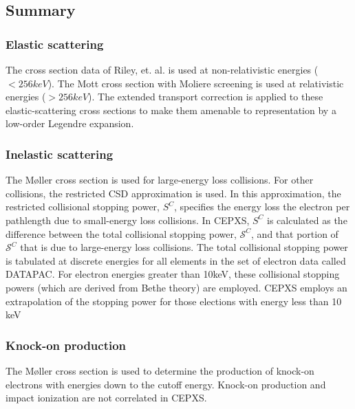 \subsection{Summary}

\subsubsection{Elastic scattering}
The cross section data of Riley, et. al. is used at non-relativistic energies
($<256 keV$). The Mott cross section with Moliere screening is used at
relativistic energies ($>256keV$). The extended transport correction is applied
to these elastic-scattering cross sections to make them amenable to
representation by a low-order Legendre expansion.

\subsubsection{Inelastic scattering}
The M\o ller cross section is used for large-energy loss collisions. For other
collisions, the restricted CSD approximation is used. In this approximation,
the restricted collisional stopping power, $S^C$, specifies the energy loss
the electron per pathlength due to small-energy loss collisions. In CEPXS,
$S^C$ is calculated as the difference between the total collisional stopping
power, $\mathcal{S}^C$, and that portion of $\mathcal{S}^C$ that is due to
large-energy loss collisions. The total collisional stopping power is
tabulated at discrete energies for all elements in the set of electron data
called DATAPAC. For electron energies greater than 10keV, these collisional
stopping powers (which are derived from Bethe theory) are employed. CEPXS
employs an extrapolation of the stopping power for those elections with energy
less than 10 keV

\subsubsection{Knock-on production}
The M\o ller cross section is used to determine the production of knock-on
electrons with energies down to the cutoff energy. Knock-on production and
impact ionization are not correlated in CEPXS.

